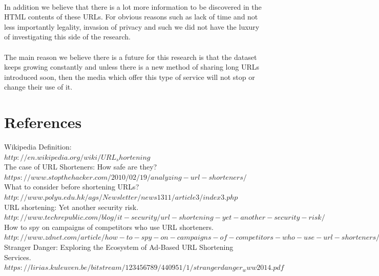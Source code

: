 \documentclass[12pt]{article}
\begin{document}
\paragraph{}
In addition we believe that there is a lot more information to be discovered in the HTML contents of these URLs. For obvious reasons such as lack of time and not less importantly legality, invasion of privacy and such we did not have the luxury of investigating this side of the research. 

\paragraph{}
The main reason we believe there is a future for this research is that the dataset keeps growing constantly and unless there is a new method of sharing long URLs introduced soon, then the media which offer this type of service will not stop or change their use of it.

\section{References}


Wikipedia Definition:\\
$http://en.wikipedia.org/wiki/URL_shortening$
\\

The case of URL Shorteners: How safe are they?\\
$https://www.stopthehacker.com/2010/02/19/analyzing-url-shorteners/$
\\

What to consider before shortening URLs?\\
$http://www.polyu.edu.hk/ags/Newsletter/news1311/article3/index3.php$
\\

URL shortening: Yet another security risk.\\
$http://www.techrepublic.com/blog/it-security/url-shortening-yet-another-security-risk/$
\\

How to spy on campaigns of competitors who use URL shorteners.\\
$http://www.zdnet.com/article/how-to-spy-on-campaigns-of-competitors-who-use-url-shorteners/$
\\

Stranger Danger: Exploring the Ecosystem of Ad-Based URL Shortening Services.\\
$https://lirias.kuleuven.be/bitstream/123456789/440951/1/strangerdanger_www2014.pdf$
\\
\end{document}
